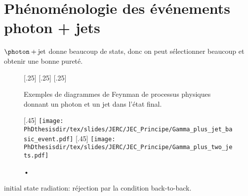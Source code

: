 \section{Phénoménologie des événements photon + jets}
$\photon+\text{jet}$ donne beaucoup de stats, donc on peut sélectionner beaucoup et obtenir une bonne pureté.
\begin{figure}[h]
\centering\vspace{\baselineskip}
\subcaptionbox{\label{subfig-fgraph-gq_qGamma_S}}[.25\textwidth]
{}
\qquad
\subcaptionbox{\label{subfig-fgraph-gq_qGamma_T}}[.25\textwidth]
{}
\qquad
\subcaptionbox{\label{subfig-fgraph-qq_gGamma}}[.25\textwidth]
{}
\caption{Exemples de diagrammes de Feynman de processus physiques donnant un photon et un jet dans l'état final.}
\label{fig-fgraph-gamma_plus_jets}
\end{figure}

\begin{figure}[h]
\centering
\subcaptionbox{\label{subfig-Gamma_plus_jet_basic_event}}[.45\textwidth]
{\texttt{[image: \\PhDthesisdir/tex/slides/JERC/JEC\_Principe/Gamma\_plus\_jet\_basic\_event.pdf]}}
\qquad
\subcaptionbox{\label{subfig-Gamma_plus_two_jets}}[.45\textwidth]
{\texttt{[image: \\PhDthesisdir/tex/slides/JERC/JEC\_Principe/Gamma\_plus\_two\_jets.pdf]}}
\caption{•}
\label{fig-Gamma_plus_jet_events}
\end{figure}

initial state radiation: réjection par la condition back-to-back.